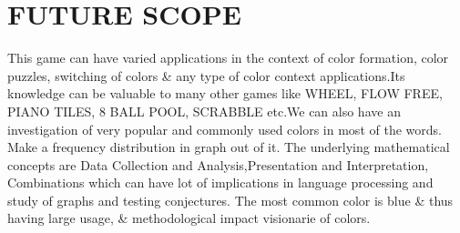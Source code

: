 \documentclass[12pt]{article}
\begin{document}
\section{FUTURE SCOPE}
This game can have varied applications in the context of color formation, color puzzles, switching of colors \& any type of color context applications.Its knowledge can be valuable to many other games like WHEEL, FLOW FREE, PIANO TILES, 8 BALL POOL, SCRABBLE etc.We can also have an investigation of very popular and commonly used colors in most of the words. Make a frequency distribution in graph out of it. The underlying mathematical concepts are Data Collection and Analysis,Presentation and Interpretation, Combinations which can have lot of implications in language processing and study of graphs and testing conjectures. The most common color is blue \& thus having large usage, \& methodological impact visionarie of colors.
\end{document}
